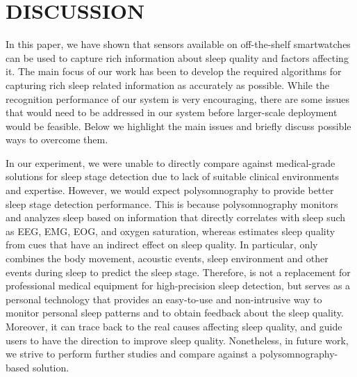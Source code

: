 \section{DISCUSSION}\label{sec:discussion}

In this paper, we have shown that sensors available on off-the-shelf smartwatches can be used to capture rich information about sleep quality and factors affecting it. The main focus of our work has been to develop the required algorithms for capturing rich sleep related information as accurately as possible. While the recognition performance of our system is very encouraging, there are some issues that would need to be addressed in our system before larger-scale deployment would be feasible. Below we highlight the main issues and briefly discuss possible ways to overcome them.


 {In our experiment, we were unable to directly compare {\systemname} against
medical-grade solutions for sleep stage detection due to lack of suitable clinical environments and expertise.} However, we would expect
polysomnography to provide better sleep stage detection performance. This is because polysomnography monitors and analyzes sleep based on
information that directly correlates with sleep such as EEG, EMG, EOG, and oxygen saturation, whereas {\systemname} estimates sleep quality
from cues that have an indirect effect on sleep quality. In particular, {\systemname} only combines the body movement, acoustic events,
sleep environment and other events during sleep to predict the sleep stage. Therefore, {\systemname} is not a replacement for professional
medical equipment for high-precision sleep detection, but serves as a personal technology that provides an easy-to-use and non-intrusive
way to monitor personal sleep patterns and to obtain feedback about the sleep quality. Moreover, it can trace back to the real causes
affecting sleep quality, and guide users to have the direction to improve sleep quality. Nonetheless, in future work, we strive to perform
further studies and compare {\systemname} against a polysomnography-based solution.

